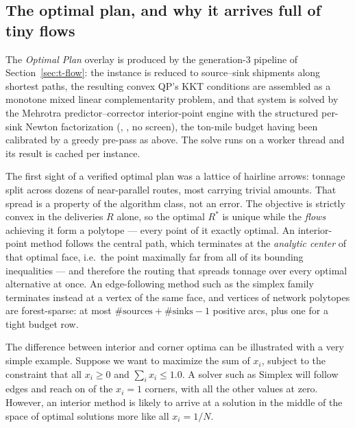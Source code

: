 \subsection{The optimal plan, and why it arrives full of tiny flows}
\label{sec:t-purify}

The \emph{Optimal Plan} overlay is produced by the generation-3 pipeline
of Section~\ref{sec:t-flow}: the instance is reduced to source--sink
shipments along shortest paths, the resulting convex QP's KKT conditions
are assembled as a monotone mixed linear complementarity problem, and
that system is solved by the Mehrotra predictor--corrector interior-point
engine with the structured per-sink Newton factorization
(, , no screen), the ton-mile
budget having been calibrated by a greedy pre-pass as above. The solve
runs on a worker thread and its result is cached per instance.


The first sight of a verified optimal plan was a lattice of hairline
arrows: tonnage split across dozens of near-parallel routes, most
carrying trivial amounts. That spread is a property of the algorithm
class, not an error. The objective is strictly convex in the deliveries
$R$ alone, so the optimal $R^\ast$ is unique while the \emph{flows}
achieving it form a polytope --- every point of it exactly optimal. An
interior-point method follows the central path, which terminates at the
\emph{analytic center} of that optimal face, i.e.\ the point maximally
far from all of its bounding inequalities --- and therefore the routing
that spreads tonnage over every optimal alternative at once. An
edge-following method such as the simplex family terminates instead at a
vertex of the same face, and vertices of network polytopes are
forest-sparse: at most $\#\text{sources} + \#\text{sinks} - 1$ positive
arcs, plus one for a tight budget row.


The difference between interior and corner optima can be illustrated with a very
simple example. Suppose we want to maximize the sum of $x_i$, subject to the
constraint that all $ x_i \ge 0$ and $\sum_i  x_i \le 1.0$.  A solver such as
Simplex will follow edges and reach on of the $x_i = 1$ corners, with all 
the other values at zero. However, an interior method is
likely to arrive at a solution in the middle of the space of optimal solutions
 more like all $x_i = 1/N$.

